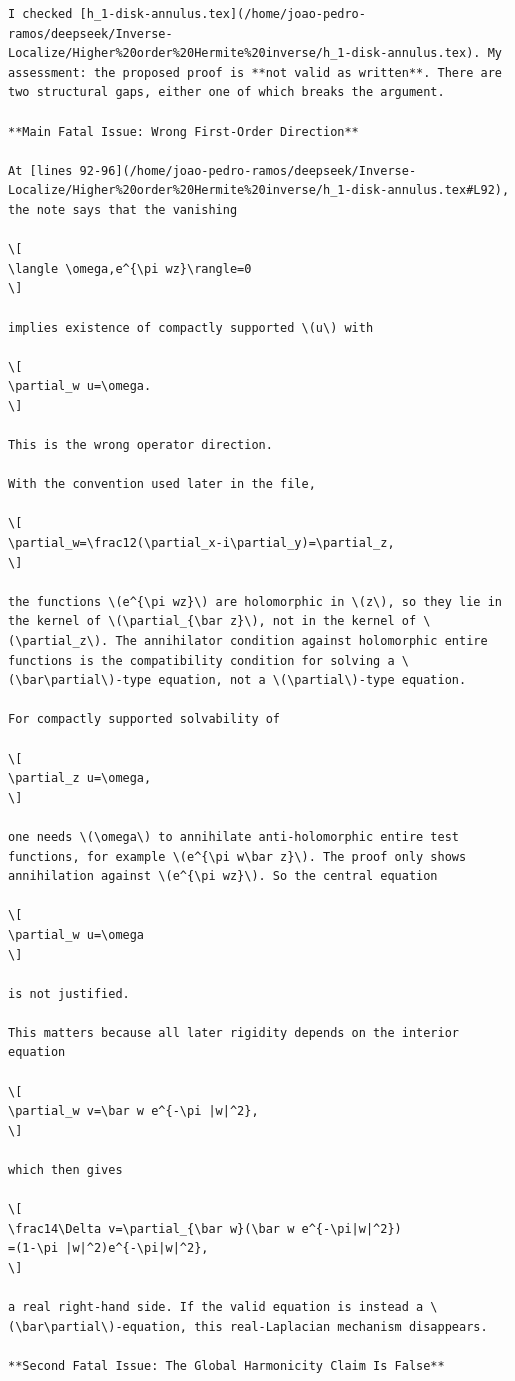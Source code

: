 \documentclass[11pt]{article}
\newcommand{\1}{\mathbf 1}
\begin{document}
\begin{verbatim}
I checked [h_1-disk-annulus.tex](/home/joao-pedro-ramos/deepseek/Inverse-Localize/Higher%20order%20Hermite%20inverse/h_1-disk-annulus.tex). My assessment: the proposed proof is **not valid as written**. There are two structural gaps, either one of which breaks the argument.

**Main Fatal Issue: Wrong First-Order Direction**

At [lines 92-96](/home/joao-pedro-ramos/deepseek/Inverse-Localize/Higher%20order%20Hermite%20inverse/h_1-disk-annulus.tex#L92), the note says that the vanishing

\[
\langle \omega,e^{\pi wz}\rangle=0
\]

implies existence of compactly supported \(u\) with

\[
\partial_w u=\omega.
\]

This is the wrong operator direction.

With the convention used later in the file,

\[
\partial_w=\frac12(\partial_x-i\partial_y)=\partial_z,
\]

the functions \(e^{\pi wz}\) are holomorphic in \(z\), so they lie in the kernel of \(\partial_{\bar z}\), not in the kernel of \(\partial_z\). The annihilator condition against holomorphic entire functions is the compatibility condition for solving a \(\bar\partial\)-type equation, not a \(\partial\)-type equation.

For compactly supported solvability of

\[
\partial_z u=\omega,
\]

one needs \(\omega\) to annihilate anti-holomorphic entire test functions, for example \(e^{\pi w\bar z}\). The proof only shows annihilation against \(e^{\pi wz}\). So the central equation

\[
\partial_w u=\omega
\]

is not justified.

This matters because all later rigidity depends on the interior equation

\[
\partial_w v=\bar w e^{-\pi |w|^2},
\]

which then gives

\[
\frac14\Delta v=\partial_{\bar w}(\bar w e^{-\pi|w|^2})
=(1-\pi |w|^2)e^{-\pi|w|^2},
\]

a real right-hand side. If the valid equation is instead a \(\bar\partial\)-equation, this real-Laplacian mechanism disappears.

**Second Fatal Issue: The Global Harmonicity Claim Is False**


\end{verbatim}
\end{document}
